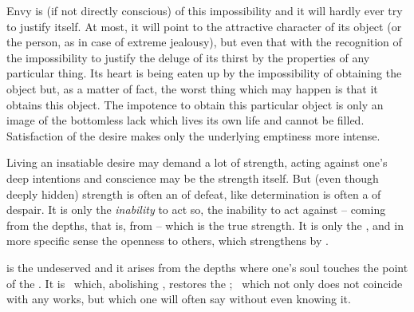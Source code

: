 {Envy is  (if not directly conscious) of this impossibility
and it will hardly ever try to justify itself. At most, it will point
to the attractive character of its object (or the person, as in case of extreme
jealousy), but even that with the recognition of the impossibility to justify
the deluge of its  thirst by the properties of any
particular thing. Its heart is being eaten up by the impossibility of obtaining
the object but, as a matter of fact, the worst thing which may happen is that it
obtains this object. The impotence to obtain this particular object is only an
 image of the bottomless lack 
which lives its own life and cannot be filled. Satisfaction of the 
desire makes only the underlying emptiness more intense. 

\pa Living an insatiable desire may demand a lot of strength, acting against
one's deep intentions and conscience may be the strength itself. But
 (even though deeply hidden) strength is often an  of
defeat, like determination is often a  of despair. It is only the {\em
  inability} to act so, the inability to act against  --
coming from the depths, that is, from  -- which is the true strength.
It is only the , and in more specific sense the openness to others,
which strengthens by .


\inv {} is the undeserved  and it arises from the
 depths where one's soul touches the point of the . It
is \Yes\ which, abolishing , restores the ;
\Yes\ which not only does not coincide with any  works, but which
one will often say without even knowing it.  
%
}

